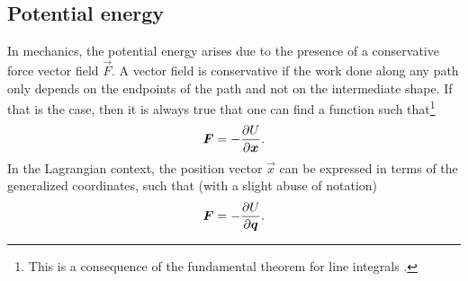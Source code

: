 \subsection{Potential energy}
In mechanics, the potential energy arises due to the presence of a conservative force vector field $\vec{F}$. A vector field is conservative if the work done along any path only depends on the endpoints of the path and not on the intermediate shape. If that is the case, then it is always true that one can find a function such that\footnote{This is a consequence of the fundamental theorem for line integrals \cite{Stewart2012}.}
$$ \vb*{F} = - \pdv{U}{\vb*{x}}. $$
In the Lagrangian context, the position vector $\vec{x}$ can be expressed in terms of the generalized coordinates, such that (with a slight abuse of notation)
$$ \vb*{F} = -\pdv{U}{\ensuremath{\vb*{q}}}. $$

